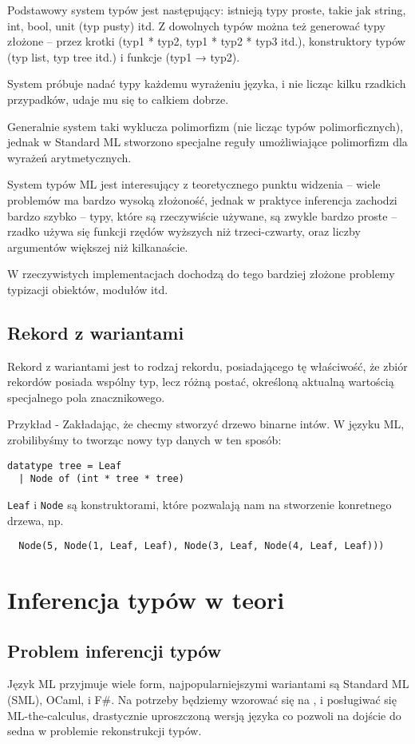 \documentclass{article}
\begin{document}
Podstawowy system typów jest następujący: istnieją typy proste, takie jak string, int, bool, unit (typ pusty) itd. Z dowolnych typów można też generować typy złożone – przez krotki (typ1 * typ2, typ1 * typ2 * typ3 itd.), konstruktory typów (typ list, typ tree itd.) i funkcje (typ1 → typ2).

System próbuje nadać typy każdemu wyrażeniu języka, i nie licząc kilku rzadkich przypadków, udaje mu się to całkiem dobrze.

Generalnie system taki wyklucza polimorfizm (nie licząc typów polimorficznych), jednak w Standard ML stworzono specjalne reguły umożliwiające polimorfizm dla wyrażeń arytmetycznych.

System typów ML jest interesujący z teoretycznego punktu widzenia – wiele problemów ma bardzo wysoką złożoność, jednak w praktyce inferencja zachodzi bardzo szybko – typy, które są rzeczywiście używane, są zwykle bardzo proste – rzadko używa się funkcji rzędów wyższych niż trzeci-czwarty, oraz liczby argumentów większej niż kilkanaście.

W rzeczywistych implementacjach dochodzą do tego bardziej złożone problemy typizacji obiektów, modułów itd.

\subsection{Rekord z wariantami} Rekord z wariantami jest to rodzaj rekordu, posiadającego tę właściwość, że zbiór rekordów posiada wspólny typ, lecz różną postać, określoną aktualną wartością specjalnego pola znacznikowego.

Przykład - Zakładając, że checmy stworzyć drzewo binarne intów. W języku ML, zrobilibyśmy to tworząc nowy typ danych w ten sposób:
\begin{verbatim}
datatype tree = Leaf
  | Node of (int * tree * tree)
\end{verbatim}
\texttt{Leaf} i \texttt{Node} są konstruktorami, które pozwalają nam na stworzenie konretnego drzewa, np.
\begin{verbatim}
  Node(5, Node(1, Leaf, Leaf), Node(3, Leaf, Node(4, Leaf, Leaf)))
\end{verbatim}
\section{Inferencja typów w teori}
\subsection{Problem inferencji typów}
Język ML przyjmuje wiele form, najpopularniejszymi wariantami są Standard ML (SML), OCaml,
i F\#. Na potrzeby będziemy wzorować się na \cite{Damas__Milner__1982}, i posługiwać się ML-the-calculus, drastycznie uproszczoną wersją języka co pozwoli na dojście do sedna w problemie rekonstrukcji typów.
\end{document}
